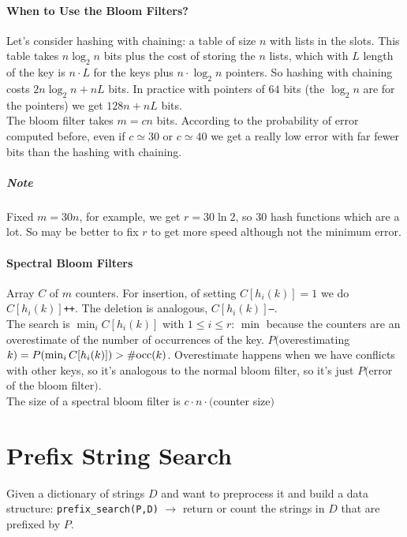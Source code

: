 \documentclass[10pt]{report}
\begin{document}
\paragraph{When to Use the Bloom Filters?} Let's consider hashing with chaining: a table of size $n$ with lists in the slots. This table takes $n\log_2 n$ bits plus the cost of storing the $n$ lists, which with $L$ length of the key is $n\cdot L$ for the keys plus $n\cdot \log_2 n$ pointers. So hashing with chaining costs $2n\log_2n + nL$ bits. In practice with pointers of $64$ bits (the $\log_2 n$ are for the pointers) we get $128n+nL$ bits.\\
The bloom filter takes $m=cn$ bits. According to the probability of error computed before, even if $c\simeq 30$ or $c\simeq 40$ we get a really low error with far fewer bits than the hashing with chaining.
\subparagraph{Note} Fixed $m=30n$, for example, we get $r=30\ln 2$, so $30$ hash functions which are a lot. So may be better to fix $r$ to get more speed although not the minimum error.
\paragraph{Spectral Bloom Filters} Array $C$ of $m$ counters. For insertion, of setting $C[h_i(k)] = 1$ we do $C[h_i(k)]$\texttt{++}. The deletion is analogous, $C[h_i(k)]$\texttt{--}.\\
The search is $\min_i C[h_i(k)]$ with $1\leq i\leq r$: $\min$ because the counters are an overestimate of the number of occurrences of the key. $P($overestimating $k)=P(\min_i C[h_i(k)])>\#\hbox{occ}(k)$. Overestimate happens when we have conflicts with other keys, so it's analogous to the normal bloom filter, so it's just $P($error of the bloom filter$)$.\\
The size of a spectral bloom filter is $c\cdot n\cdot($counter size$)$
\section{Prefix String Search}
Given a dictionary of strings $D$ and want to preprocess it and build a data structure: \texttt{prefix\_search(P,D)} $\rightarrow$ return or count the strings in $D$ that are prefixed by $P$.
\end{document}
